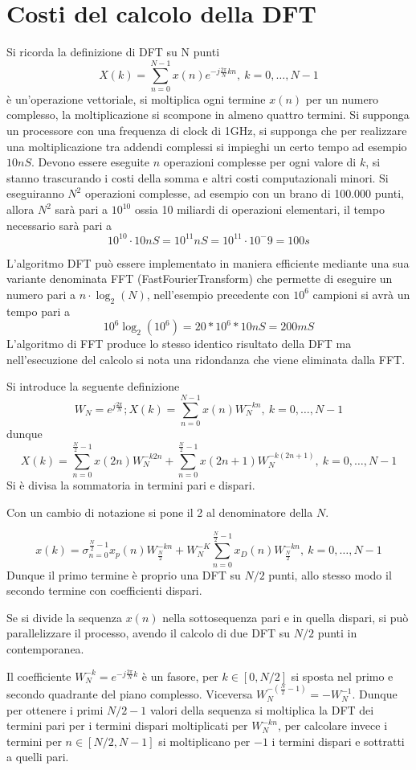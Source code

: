 \section{Costi del calcolo della DFT}
Si ricorda la definizione di DFT su N punti
$$
X(k) = \sum_{n=0}^{N-1}x(n)e^{-j\frac{2\pi}{N}kn},\ k = 0,\dots,N-1
$$
è un'operazione vettoriale, si moltiplica ogni termine $x(n)$ per un numero
complesso, la moltiplicazione si scompone in almeno quattro termini.
Si supponga un processore con una frequenza di clock di 1GHz, si supponga che
per realizzare una moltiplicazione tra addendi complessi si impieghi un certo
tempo ad esempio $10nS$.
Devono essere eseguite $n$ operazioni complesse per ogni valore di $k$, si
stanno trascurando i costi della somma e altri costi computazionali minori.
Si eseguiranno $N^2$ operazioni complesse, ad esempio con un brano di 100.000
punti, allora $N^2$ sarà pari a $10^10$ ossia 10 miliardi di operazioni
elementari, il tempo necessario sarà pari a
$$
10^10 \cdot 10nS = 10^11 nS = 10^11 \cdot 10^-9 = 100s
$$

L'algoritmo DFT può essere implementato in maniera efficiente mediante una sua
variante denominata FFT (FastFourierTransform) che permette di eseguire un
numero pari a $n\cdot\log_2(N)$, nell'esempio precedente con $10^6$ campioni si
avrà un tempo pari a
$$
10^6\log_2(10^6) = 20 * 10^6 * 10nS = 200 mS
$$
L'algoritmo di FFT produce lo stesso identico risultato della DFT ma
nell'esecuzione del calcolo si nota una ridondanza che viene eliminata dalla
FFT.

Si introduce la seguente definizione
$$
W_N = e^{j\frac{2\pi}{N}}; X(k) = \sum_{n=0}^{N-1} x(n) W_N^{-kn},\
k=0,\dots,N-1
$$
dunque
$$
X(k) = \sum_{n=0}^{\frac{N}{2}-1}x(2n) W_N^{-k2n} + \sum_{n=0}^{\frac{N}{2}-1}
x(2n+1)W_N^{-k(2n+1)},\ k=0,\dots,N-1
$$
Si è divisa la sommatoria in termini pari e dispari.

Con un cambio di notazione si pone il 2 al denominatore della $N$.

$$
x(k) = \sigma_{n=0}^{\frac{N}{2}-1} x_p(n) W_{\frac{N}{2}}^{-kn} +
W_N^{-K}\sum_{n=0}^{\frac{N}{2}-1}x_D(n) W_{\frac{N}{2}}^{-kn},\ k=0,\dots,N-1
$$
Dunque il primo termine è proprio una DFT su $N/2$ punti, allo stesso modo il
secondo termine con coefficienti dispari.

Se si divide la sequenza $x(n)$ nella sottosequenza pari e in quella dispari,
si può parallelizzare il processo, avendo il calcolo di due DFT su $N/2$ punti
in contemporanea.

Il coefficiente $W_N^{-k} = e^{-j\frac{2\pi}{N}k}$ è un fasore, per
$k\in[0,N/2]$ si sposta nel primo e secondo quadrante del piano complesso.
Viceversa $W_N^{-\left(\frac{N}{2}-1\right)} = -W_N^{-1}$.
Dunque per ottenere i primi $N/2-1$ valori della sequenza si moltiplica la DFT
dei termini pari per i termini dispari moltiplicati per $W_N^{-kn}$, per
calcolare invece i termini per $n\in[N/2, N-1]$ si moltiplicano per $-1$ i
termini dispari e sottratti a quelli pari.


